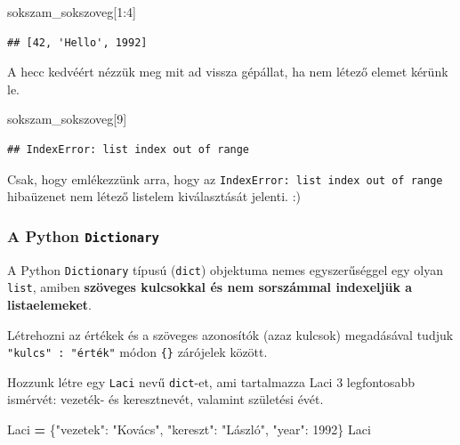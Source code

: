 \documentclass[
]{book}
\newenvironment{Shaded}{\begin{snugshade}}{\end{snugshade}}
\newcommand{\DecValTok}[1]{\textcolor[rgb]{0.00,0.00,0.81}{#1}}
\newcommand{\NormalTok}[1]{#1}
\newcommand{\OperatorTok}[1]{\textcolor[rgb]{0.81,0.36,0.00}{\textbf{#1}}}
\newcommand{\StringTok}[1]{\textcolor[rgb]{0.31,0.60,0.02}{#1}}
\begin{document}
\begin{Shaded}
\begin{Highlighting}[]
\NormalTok{sokszam\_sokszoveg[}\DecValTok{1}\NormalTok{:}\DecValTok{4}\NormalTok{]}
\end{Highlighting}
\end{Shaded}

\begin{verbatim}
## [42, 'Hello', 1992]
\end{verbatim}

A hecc kedvéért nézzük meg mit ad vissza gépállat, ha nem létező elemet kérünk le.

\begin{Shaded}
\begin{Highlighting}[]
\NormalTok{sokszam\_sokszoveg[}\DecValTok{9}\NormalTok{]}
\end{Highlighting}
\end{Shaded}

\begin{verbatim}
## IndexError: list index out of range
\end{verbatim}

Csak, hogy emlékezzünk arra, hogy az \texttt{IndexError:\ list\ index\ out\ of\ range} hibaüzenet nem létező listelem kiválasztását jelenti. :)

\subsubsection{\texorpdfstring{A Python \texttt{Dictionary}}{A Python Dictionary}}\label{a-python-dictionary}

A Python \texttt{Dictionary} típusú (\texttt{dict}) objektuma nemes egyszerűséggel egy olyan \texttt{list}, amiben \textbf{szöveges kulcsokkal és nem sorszámmal indexeljük a listaelemeket}.

Létrehozni az értékek és a szöveges azonosítók (azaz kulcsok) megadásával tudjuk \texttt{"kulcs"\ :\ "érték"} módon \texttt{\{\}} zárójelek között.

Hozzunk létre egy \texttt{Laci} nevű \texttt{dict}-et, ami tartalmazza Laci 3 legfontosabb ismérvét: vezeték- és keresztnevét, valamint születési évét.

\begin{Shaded}
\begin{Highlighting}[]
\NormalTok{Laci }\OperatorTok{=}\NormalTok{ \{}\StringTok{"vezetek"}\NormalTok{: }\StringTok{"Kovács"}\NormalTok{,}
\StringTok{"kereszt"}\NormalTok{: }\StringTok{"László"}\NormalTok{,}
\StringTok{"year"}\NormalTok{: }\DecValTok{1992}\NormalTok{\}}
\NormalTok{Laci}
\end{Highlighting}
\end{Shaded}
\end{document}

